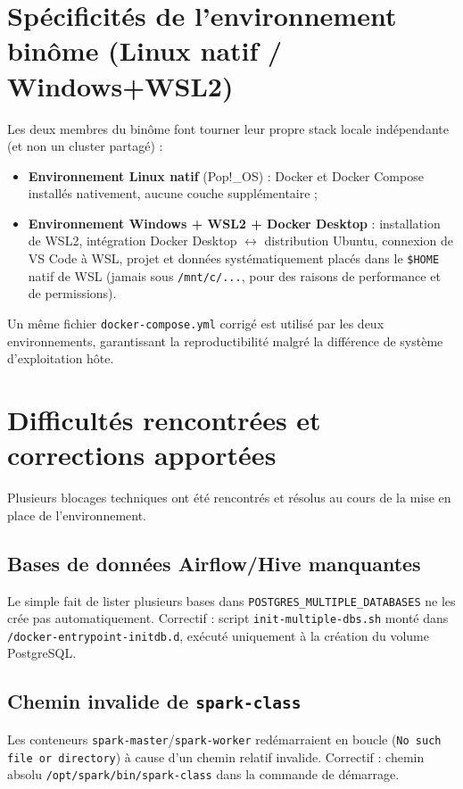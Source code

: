 \documentclass[11pt,a4paper]{report}
\begin{document}
\section{Spécificités de l'environnement binôme (Linux natif / Windows+WSL2)}
Les deux membres du binôme font tourner leur propre stack locale
indépendante (et non un cluster partagé) :

\begin{itemize}
  \item \textbf{Environnement Linux natif} (Pop!\_OS) : Docker et Docker
  Compose installés nativement, aucune couche supplémentaire ;
  \item \textbf{Environnement Windows + WSL2 + Docker Desktop} :
  installation de WSL2, intégration Docker Desktop $\leftrightarrow$
  distribution Ubuntu, connexion de VS Code à WSL, projet et données
  systématiquement placés dans le \texttt{\$HOME} natif de WSL (jamais sous
  \texttt{/mnt/c/...}, pour des raisons de performance et de permissions).
\end{itemize}

Un même fichier \texttt{docker-compose.yml} corrigé est utilisé par les
deux environnements, garantissant la reproductibilité malgré la différence
de système d'exploitation hôte.

\section{Difficultés rencontrées et corrections apportées}
Plusieurs blocages techniques ont été rencontrés et résolus au cours de la
mise en place de l'environnement.

\subsection{Bases de données Airflow/Hive manquantes}
Le simple fait de lister plusieurs bases dans
\texttt{POSTGRES\_MULTIPLE\_DATABASES} ne les crée pas automatiquement.
Correctif : script \texttt{init-multiple-dbs.sh} monté dans
\texttt{/docker-entrypoint-initdb.d}, exécuté uniquement à la création du
volume PostgreSQL.

\subsection{Chemin invalide de \texttt{spark-class}}
Les conteneurs \texttt{spark-master}/\texttt{spark-worker} redémarraient
en boucle (\texttt{No such file or directory}) à cause d'un chemin relatif
invalide. Correctif : chemin absolu
\texttt{/opt/spark/bin/spark-class} dans la commande de démarrage.
\end{document}
